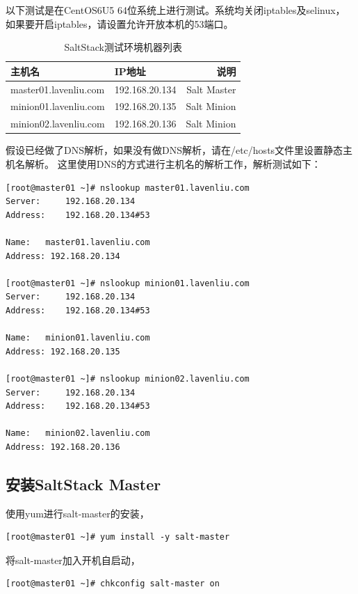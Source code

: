 以下测试是在CentOS6U5 64位系统上进行测试。系统均关闭iptables及selinux，
如果要开启iptables，请设置允许开放本机的53端口。

\begin{table}[htbp]
  \centering
    \caption{SaltStack测试环境机器列表}
    \label{tab:saltTestMachineList}
    \begin{tabular}{llr}
      \toprule
      主机名     & IP地址 & 说明 \\
      \midrule
      master01.lavenliu.com  & 192.168.20.134 &  Salt Master \\
      minion01.lavenliu.com  & 192.168.20.135 &  Salt Minion \\
      minion02.lavenliu.com  & 192.168.20.136 &  Salt Minion \\
      \bottomrule
    \end{tabular}
\end{table}

假设已经做了DNS解析，如果没有做DNS解析，请在/etc/hosts文件里设置静态主机名解析。
这里使用DNS的方式进行主机名的解析工作，解析测试如下：

\begin{verbatim}
[root@master01 ~]# nslookup master01.lavenliu.com
Server:		192.168.20.134
Address:	192.168.20.134#53

Name:	master01.lavenliu.com
Address: 192.168.20.134

[root@master01 ~]# nslookup minion01.lavenliu.com
Server:		192.168.20.134
Address:	192.168.20.134#53

Name:	minion01.lavenliu.com
Address: 192.168.20.135

[root@master01 ~]# nslookup minion02.lavenliu.com
Server:		192.168.20.134
Address:	192.168.20.134#53

Name:	minion02.lavenliu.com
Address: 192.168.20.136
\end{verbatim}

\subsection{安装SaltStack Master}
\label{sec:installSaltMaster}

使用yum进行salt-master的安装，

\begin{verbatim}
[root@master01 ~]# yum install -y salt-master
\end{verbatim}

将salt-master加入开机自启动，

\begin{verbatim}
[root@master01 ~]# chkconfig salt-master on
\end{verbatim}

